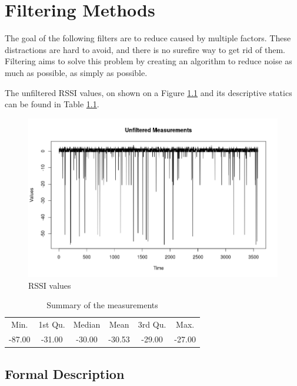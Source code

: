 \chapter{Filtering Methods}
\onehalfspacing
\label{chap:filteringMethods}
The goal of the following filters are to reduce caused by  multiple factors. These distractions are hard to avoid, and there is no surefire way to get rid of them. Filtering aims to solve this problem by creating an algorithm to reduce noise as much as possible, as simply as possible.


The unfiltered RSSI values, on shown on a Figure \ref{fig:UnfilteredZero} and its descriptive statics can be found in Table \ref{tab:summaryA}.

\begin{figure}[!h]
	\centering
		\includegraphics[width=.9\linewidth]{figures/UnfilteredZeroV1.png}
		\caption{RSSI values }\label{fig:UnfilteredZero}
\end{figure}


\begin{table}[h]
\centering
\caption{Summary of the measurements}\label{tab:summaryA}
\begin{tabular}{cccccc}
Min.& 1st Qu. & Median & Mean & 3rd Qu. & Max.\\
-87.00 & -31.00 & -30.00 & -30.53 & -29.00 & -27.00
\end{tabular}
\end{table}

\section{Formal Description}

